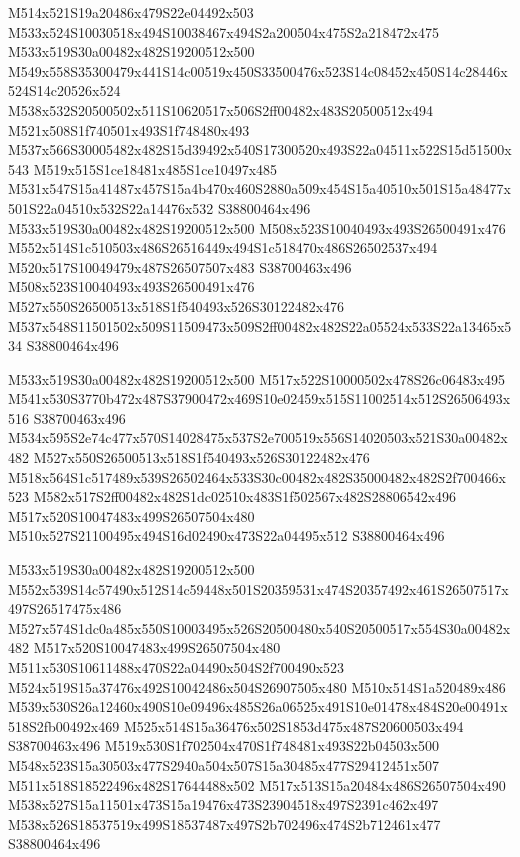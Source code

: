 \documentclass{article}
\begin{document}
\begin{multicols}{2}
M514x521S19a20486x479S22e04492x503 M533x524S10030518x494S10038467x494S2a200504x475S2a218472x475 M533x519S30a00482x482S19200512x500 M549x558S35300479x441S14c00519x450S33500476x523S14c08452x450S14c28446x524S14c20526x524 M538x532S20500502x511S10620517x506S2ff00482x483S20500512x494 M521x508S1f740501x493S1f748480x493 M537x566S30005482x482S15d39492x540S17300520x493S22a04511x522S15d51500x543 M519x515S1ce18481x485S1ce10497x485 M531x547S15a41487x457S15a4b470x460S2880a509x454S15a40510x501S15a48477x501S22a04510x532S22a14476x532 S38800464x496 M533x519S30a00482x482S19200512x500 M508x523S10040493x493S26500491x476 M552x514S1c510503x486S26516449x494S1c518470x486S26502537x494 M520x517S10049479x487S26507507x483 S38700463x496 M508x523S10040493x493S26500491x476 M527x550S26500513x518S1f540493x526S30122482x476 M537x548S11501502x509S11509473x509S2ff00482x482S22a05524x533S22a13465x534 S38800464x496

M533x519S30a00482x482S19200512x500 M517x522S10000502x478S26c06483x495 M541x530S3770b472x487S37900472x469S10e02459x515S11002514x512S26506493x516 S38700463x496 M534x595S2e74c477x570S14028475x537S2e700519x556S14020503x521S30a00482x482 M527x550S26500513x518S1f540493x526S30122482x476 M518x564S1c517489x539S26502464x533S30c00482x482S35000482x482S2f700466x523 M582x517S2ff00482x482S1dc02510x483S1f502567x482S28806542x496 M517x520S10047483x499S26507504x480 M510x527S21100495x494S16d02490x473S22a04495x512 S38800464x496

M533x519S30a00482x482S19200512x500 M552x539S14c57490x512S14c59448x501S20359531x474S20357492x461S26507517x497S26517475x486 M527x574S1dc0a485x550S10003495x526S20500480x540S20500517x554S30a00482x482 M517x520S10047483x499S26507504x480 M511x530S10611488x470S22a04490x504S2f700490x523 M524x519S15a37476x492S10042486x504S26907505x480 M510x514S1a520489x486 M539x530S26a12460x490S10e09496x485S26a06525x491S10e01478x484S20e00491x518S2fb00492x469 M525x514S15a36476x502S1853d475x487S20600503x494 S38700463x496 M519x530S1f702504x470S1f748481x493S22b04503x500 M548x523S15a30503x477S2940a504x507S15a30485x477S29412451x507 M511x518S18522496x482S17644488x502 M517x513S15a20484x486S26507504x490 M538x527S15a11501x473S15a19476x473S23904518x497S2391c462x497 M538x526S18537519x499S18537487x497S2b702496x474S2b712461x477 S38800464x496


\end{multicols}
\end{document}
